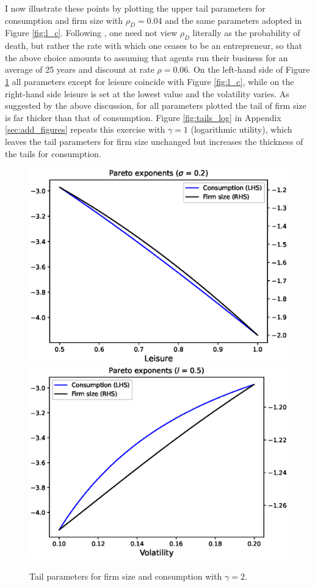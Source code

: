 \documentclass[11pt]{article}
\theoremstyle{plain}
\newcommand{\rhoval}{0.06}
\begin{document}
I now illustrate these points by plotting the upper tail parameters for consumption and firm size with $\rho_D = 0.04$ and the same parameters adopted in Figure \ref{fig:l_c}. Following \cite{jones_schumpeterian_2018}, one need not view $\rho_D$ literally as the probability of death, but rather the rate with which one ceases to be an entrepreneur, so that the above choice amounts to assuming that agents run their business for an average of 25 years and discount at rate $\rho = \rhoval$. On the left-hand side of Figure \ref{fig:tails} all parameters except for leisure coincide with Figure \ref{fig:l_c}, while on the right-hand side leisure is set at the lowest value and the volatility varies. As suggested by the above discussion, for all parameters plotted the tail of firm size is far thicker than that of consumption. Figure \ref{fig:tails_log} in Appendix \ref{sec:add_figures} repeats this exercise with $\gamma=1$ (logarithmic utility), which leaves the tail parameters for firm size unchanged but increases the thickness of the tails for consumption.


\begin{figure}[!htb]
\centering
\includegraphics[width=0.49\linewidth]{tails}
\includegraphics[width=0.49\linewidth]{tails_sig}
\caption{Tail parameters for firm size and consumption with $\gamma=2$.}\label{fig:tails}
\end{figure}
\end{document}
